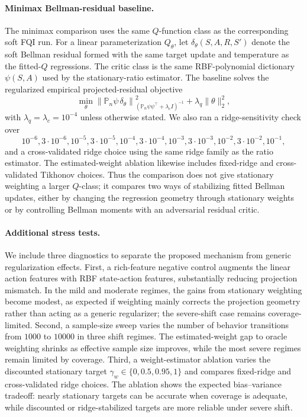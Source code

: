 \documentclass{article}
\theoremstyle{plain}
\theoremstyle{definition}
\theoremstyle{remark}
\begin{document}
\paragraph{Minimax Bellman-residual baseline.}
The minimax comparison uses the same \(Q\)-function class as the corresponding
soft FQI run. For a linear parameterization \(Q_\theta\), let
\(\delta_\theta(S,A,R,S')\) denote the soft Bellman residual formed with the
same target update and temperature as the fitted-\(Q\) regressions. The critic
class is the same RBF-polynomial dictionary \(\psi(S,A)\) used by the
stationary-ratio estimator. The baseline solves the regularized empirical
projected-residual objective
\[
  \min_\theta
  \left\|
    \mathbb P_n \psi\,\delta_\theta
  \right\|_{(\mathbb P_n\psi\psi^\top+\lambda_c I)^{-1}}^2
  + \lambda_q\|\theta\|_2^2 ,
\]
with \(\lambda_q=\lambda_c=10^{-4}\) unless otherwise stated. We also ran a
ridge-sensitivity check over
\[
10^{-6},3\cdot10^{-6},10^{-5},3\cdot10^{-5},10^{-4},
3\cdot10^{-4},10^{-3},3\cdot10^{-3},10^{-2},3\cdot10^{-2},10^{-1},
\]
and a cross-validated ridge choice using the same ridge family as the ratio
estimator. The estimated-weight ablation likewise includes fixed-ridge and
cross-validated Tikhonov choices. Thus the comparison does not give stationary
weighting a larger \(Q\)-class; it compares two ways of stabilizing fitted
Bellman updates, either by changing the regression geometry through stationary
weights or by controlling Bellman moments with an adversarial residual critic.

\paragraph{Additional stress tests.}
We include three diagnostics to separate the proposed mechanism from generic
regularization effects. First, a rich-feature negative control augments the
linear action features with RBF state-action features, substantially reducing
projection mismatch. In the mild and moderate regimes, the gains from
stationary weighting become modest, as expected if weighting mainly corrects
the projection geometry rather than acting as a generic regularizer; the
severe-shift case remains coverage-limited. Second, a sample-size sweep varies
the number of behavior transitions from \(1000\) to \(10000\) in three shift
regimes. The estimated-weight gap to oracle weighting shrinks as effective
sample size improves, while the most severe regimes remain limited by coverage.
Third, a weight-estimator ablation varies the discounted stationary target
\(\gamma_w\in\{0,0.5,0.95,1\}\) and compares fixed-ridge and cross-validated
ridge choices. The ablation shows the expected bias--variance tradeoff: nearly
stationary targets can be accurate when coverage is adequate, while discounted
or ridge-stabilized targets are more reliable under severe shift.
\end{document}
